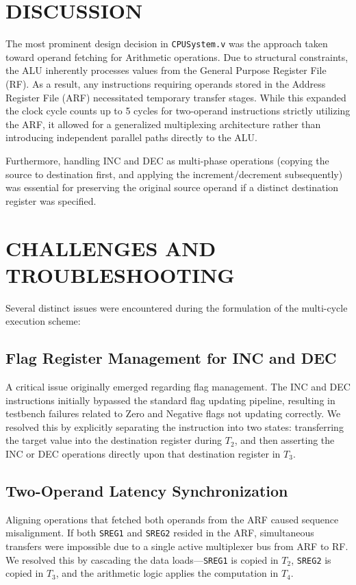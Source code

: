 \documentclass[pdftex,12pt,a4paper]{article}
\begin{document}
\section{DISCUSSION}
The most prominent design decision in \texttt{CPUSystem.v} was the approach taken toward operand fetching for Arithmetic operations. Due to structural constraints, the ALU inherently processes values from the General Purpose Register File (RF). As a result, any instructions requiring operands stored in the Address Register File (ARF) necessitated temporary transfer stages. While this expanded the clock cycle counts up to 5 cycles for two-operand instructions strictly utilizing the ARF, it allowed for a generalized multiplexing architecture rather than introducing independent parallel paths directly to the ALU. 

Furthermore, handling INC and DEC as multi-phase operations (copying the source to destination first, and applying the increment/decrement subsequently) was essential for preserving the original source operand if a distinct destination register was specified. 

\section{CHALLENGES AND TROUBLESHOOTING}
Several distinct issues were encountered during the formulation of the multi-cycle execution scheme:

\subsection{Flag Register Management for INC and DEC}
A critical issue originally emerged regarding flag management. The INC and DEC instructions initially bypassed the standard flag updating pipeline, resulting in testbench failures related to Zero and Negative flags not updating correctly. We resolved this by explicitly separating the instruction into two states: transferring the target value into the destination register during $T_2$, and then asserting the INC or DEC operations directly upon that destination register in $T_3$.

\subsection{Two-Operand Latency Synchronization}
Aligning operations that fetched both operands from the ARF caused sequence misalignment. If both \texttt{SREG1} and \texttt{SREG2} resided in the ARF, simultaneous transfers were impossible due to a single active multiplexer bus from ARF to RF. We resolved this by cascading the data loads---\texttt{SREG1} is copied in $T_2$, \texttt{SREG2} is copied in $T_3$, and the arithmetic logic applies the computation in $T_4$.
\end{document}
